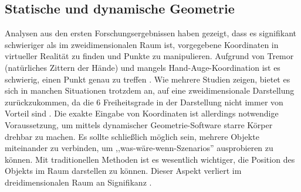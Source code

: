 \documentclass[deutsch]{llncs}
\begin{document}
\subsection{Statische und dynamische Geometrie}
Analysen aus den ersten Forschungsergebnissen haben gezeigt, dass es signifikant schwieriger als im zweidimensionalen Raum ist, vorgegebene Koordinaten in virtueller Realität zu finden und Punkte zu manipulieren. Aufgrund von Tremor (natürliches Zittern der Hände) und mangels Hand-Auge-Koordination ist es schwierig, einen Punkt genau zu treffen \cite{1667626}. 
Wie mehrere Studien zeigen, bietet es sich in manchen Situationen trotzdem an, auf eine zweidimensionale Darstellung zurückzukommen, da die 6 Freiheitsgrade in der Darstellung nicht immer von Vorteil sind \cite{Bowman:1999:ITC:930593}. 
Die exakte Eingabe von Koordinaten ist allerdings notwendige Voraussetzung, um mittels dynamischer Geometrie-Software starre Körper drehbar zu machen. Es sollte schließlich möglich sein, mehrere Objekte miteinander zu verbinden, um ,,was-wäre-wenn-Szenarios'' ausprobieren zu können. Mit traditionellen Methoden ist es wesentlich wichtiger, die Position des Objekts im Raum darstellen zu können. Dieser Aspekt verliert im dreidimensionalen Raum an Signifikanz \cite{1667626}. 
\end{document}
